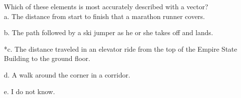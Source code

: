 
Which of these elements is most accurately described with a vector? \\

a. The distance from start to finish that a marathon runner covers.

b. The path followed by a ski jumper as he or she takes off and lands.

*c. The distance traveled in an elevator ride from the top of the Empire State Building to the ground floor.

d. A walk around the corner in a corridor.

e. I do not know. \\

